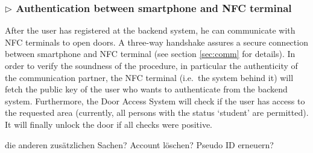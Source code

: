 


\subsubsection*{$\triangleright$ Authentication between smartphone and NFC terminal}

After the user has registered at the backend system, he can communicate with NFC terminals to open doors. 
A three-way handshake assures a secure connection between smartphone and NFC terminal (see section \ref{sec:comm} for details).
In order to verify the soundness of the procedure, in particular the authenticity of the communication partner, the NFC terminal (i.e.~the system behind it) will fetch the public key of the user who wants to authenticate from the backend system.
Furthermore, the Door Access System will check if the user has access to the requested area (currently, all persons with the status `student' are permitted).
It will finally unlock the door if all checks were positive.

\medskip




die anderen zusätzlichen Sachen? Account löschen? Pseudo ID erneuern?
